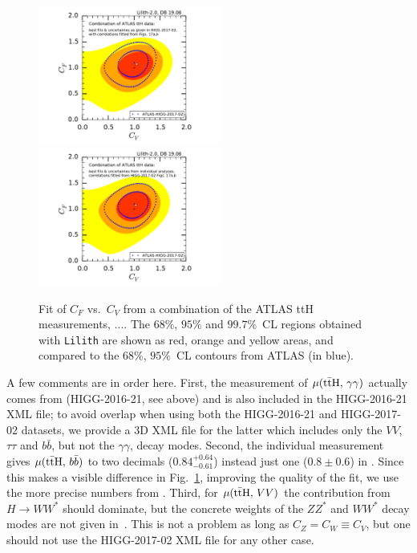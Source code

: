 \begin{figure}[htb!]\centering
\includegraphics[width=0.54\textwidth]{validation/ATLAS/HIGG-2017-02-CVCF-off-corr.pdf}%
\hspace{-13mm}\includegraphics[width=0.54\textwidth]{validation/ATLAS/HIGG-2017-02-CVCF-fit-corr.pdf}%
\vspace*{-2mm}
\caption{Fit of $C_F$ vs.\ $C_V$ from a combination of the ATLAS ttH measurements, ....
The  $68\%$,  $95\%$ and $99.7\%$~CL regions obtained with {\tt Lilith} are shown as red, orange and yellow areas, 
and compared to the $68\%$,  $95\%$~CL contours from ATLAS (in blue).}
\label{fig:validation_atlas_ttH}
\end{figure}

A few comments are in order here. First, the measurement of $\mu({\rm t\bar tH},\,\gamma\gamma)$ actually comes from 
\cite{Aaboud:2018xdt} (HIGG-2016-21, see above) and is also included in the HIGG-2016-21 XML file; 
to avoid overlap when using both the HIGG-2016-21 and HIGG-2017-02 datasets, we provide a 3D XML file for the latter 
which includes only the $VV$, $\tau\tau$ and $b\bar b$, but not the $\gamma\gamma$, decay modes. 
Second, the individual measurement \cite{Aaboud:2017rss} gives $\mu({\rm t\bar tH},\,b\bar b)$ to two decimals 
($0.84^{+0.64}_{-0.61}$) instead just one ($0.8\pm 0.6$) in \cite{Aaboud:2017jvq}. Since this makes a visible difference 
in Fig.~\ref{fig:validation_atlas_ttH}, improving the quality of the fit, we use the more precise numbers from  \cite{Aaboud:2017rss}. 
Third, for $\mu({\rm t\bar tH},\,VV)$ the contribution from $H\to WW^*$ should dominate, but the concrete weights of the 
$ZZ^*$ and $WW^*$ decay modes are not given in~\cite{Aaboud:2017jvq}. This is not a problem as long as $C_Z=C_W\equiv C_V$, but one should 
not use the HIGG-2017-02 XML file for any other case.\\


